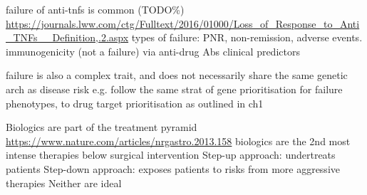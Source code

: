 \begin{outline}
\1 failure of anti-tnfs is common (TODO\%) \url{https://journals.lww.com/ctg/Fulltext/2016/01000/Loss_of_Response_to_Anti_TNFs__Definition,.2.aspx}
    \2 types of failure: \gls{PNR}, non-remission, adverse events.
        \3 immunogenicity (not a failure) via anti-drug Abs
        \3 clinical predictors \autocite{kennedy2019PredictorsAntiTNFTreatment}

\1 failure is also a complex trait, and does not necessarily share the same genetic arch as disease risk
    \2 e.g. \autocite{sazonovs2019HLADQA105Carriage}
    \2 follow the same strat of gene prioritisation for failure phenotypes, to drug target prioritisation as outlined in ch1


\1 Biologics are part of the treatment pyramid \url{https://www.nature.com/articles/nrgastro.2013.158}
    \2 biologics are the 2nd most intense therapies below surgical intervention
    \2 Step-up approach: undertreats patients
    \2 Step-down approach: exposes patients to risks from more aggressive therapies
    \2 Neither are ideal


\end{outline}
